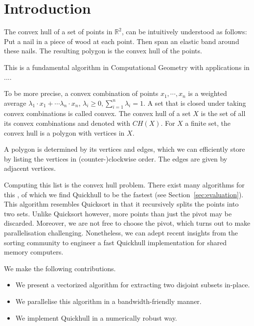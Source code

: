 \section{Introduction}

The convex hull of a set of points in $\mathbb{R}^2$, can be intuitively 
understood as follows: Put a nail in a piece of wood at each point. Then span 
an elastic band around these nails. The resulting polygon is the convex hull of 
the points.

This is a fundamental algorithm in Computational Geometry with applications
in .... 

To be more precise, a convex combination of points $x_1, \cdots, x_n$ is a 
weighted average $\lambda_1 \cdot x_1 + \cdots \lambda_n \cdot x_n$, 
$\lambda_i \geq 0, \sum_{i = 1}^n \lambda_i = 1$. A set that is closed under
taking convex combinations is called convex. The convex hull of a set $X$ is
the set of all its convex combinations and denoted with $CH(X)$. For $X$
a finite set, the convex hull is a polygon with vertices in $X$.

A polygon is determined by its vertices and edges, which we can efficiently
store by listing the vertices in (counter-)clockwise order. The edges are given 
by adjacent vertices.

Computing this list is the convex hull problem. There exist many algorithms for 
this \cite{}, of which we find Quickhull to be the fastest (see
Section~\ref{sec:evaluation}). This algorithm resembles Quicksort in that
it recursively splits the points into two sets. Unlike Quicksort however,
more points than just the pivot may be discarded. Moreover, we are not
free to choose the pivot, which turns out to make parallelisation challenging.
Nonetheless, we can adept recent insights from the sorting community to engineer
a fast Quickhull implementation for shared memory computers.

We make the following contributions.

\begin{itemize}
    \item We present a vectorized algorithm for extracting two disjoint
          subsets in-place.
    \item We parallelise this algorithm in a bandwidth-friendly manner.
    \item We implement Quickhull in a numerically robust way.
\end{itemize}
